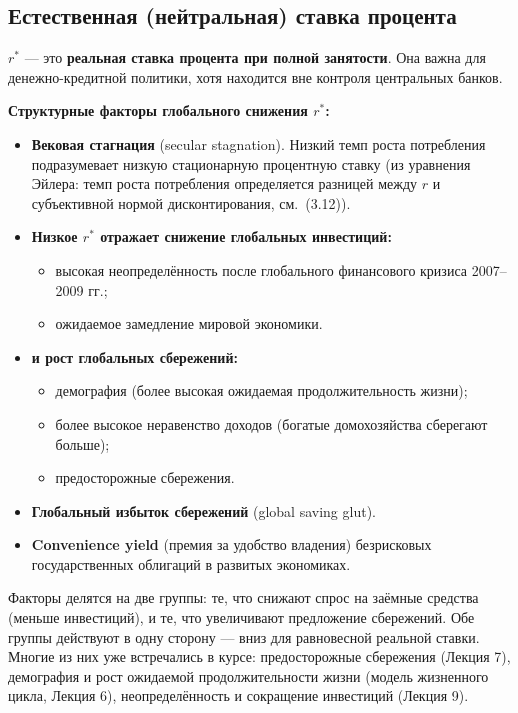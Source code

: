 \documentclass[10pt,a4paper]{article}
\begin{document}
\subsection{Естественная (нейтральная) ставка процента}

$r^{*}$ — это \textbf{реальная ставка процента при полной занятости}. Она важна для денежно-кредитной политики, хотя находится вне контроля центральных банков.

\textbf{Структурные факторы глобального снижения $r^{*}$:}
\begin{itemize}[leftmargin=1.3em]
\item \textbf{Вековая стагнация} (secular stagnation). Низкий темп роста потребления подразумевает низкую стационарную процентную ставку (из уравнения Эйлера: темп роста потребления определяется разницей между $r$ и субъективной нормой дисконтирования, см.\ (3.12)).
\item \textbf{Низкое $r^{*}$ отражает снижение глобальных инвестиций:}
  \begin{itemize}[leftmargin=1.3em]
  \item высокая неопределённость после глобального финансового кризиса 2007--2009 гг.;
  \item ожидаемое замедление мировой экономики.
  \end{itemize}
\item \textbf{и рост глобальных сбережений:}
  \begin{itemize}[leftmargin=1.3em]
  \item демография (более высокая ожидаемая продолжительность жизни);
  \item более высокое неравенство доходов (богатые домохозяйства сберегают больше);
  \item предосторожные сбережения.
  \end{itemize}
\item \textbf{Глобальный избыток сбережений} (global saving glut).
\item \textbf{Convenience yield} (премия за удобство владения) безрисковых государственных облигаций в развитых экономиках.
\end{itemize}

\begin{intuition}
Факторы делятся на две группы: те, что снижают спрос на заёмные средства (меньше инвестиций), и те, что увеличивают предложение сбережений. Обе группы действуют в одну сторону — вниз для равновесной реальной ставки. Многие из них уже встречались в курсе: предосторожные сбережения (Лекция 7), демография и рост ожидаемой продолжительности жизни (модель жизненного цикла, Лекция 6), неопределённость и сокращение инвестиций (Лекция 9).
\end{intuition}
\end{document}
